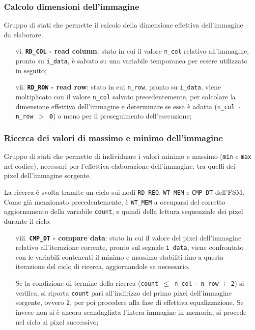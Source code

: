 \documentclass{article}
\begin{document}
\subsubsection{Calcolo dimensioni dell'immagine} %
Gruppo di stati che permette il calcolo della dimensione effettiva dell’immagine da elaborare.

\begin{itemize}
    \item [vi.]     \textbf{\texttt{RD\_COL} - read column}: stato in cui il valore \texttt{n\_col} relativo all’immagine, pronto su \texttt{i\_data}, è salvato su una variabile temporanea per essere utilizzato in seguito;
    \item [vii.]    \textbf{\texttt{RD\_ROW} - read row}: stato in cui \texttt{n\_row}, pronto su \texttt{i\_data}, viene moltiplicato con il valore \texttt{n\_col} salvato precedentemente, per calcolare la dimensione effettiva dell’immagine e determinare se essa è adatta (\texttt{n\_col $\cdot$ n\_row $>$ 0}) o meno per il proseguimento dell’esecuzione;
\end{itemize}

\subsubsection{Ricerca dei valori di massimo e minimo dell'immagine} %
Gruppo di stati che permette di individuare i valori minimo e massimo (\texttt{min} e \texttt{max} nel codice), necessari per l’effettiva elaborazione dell’immagine, tra quelli dei pixel dell’immagine sorgente.\par
La ricerca è svolta tramite un ciclo sui nodi \texttt{RD\_REQ}, \texttt{WT\_MEM} e \texttt{CMP\_DT} dell’FSM. Come già menzionato precedentemente, è \texttt{WT\_MEM} a occuparsi del corretto aggiornamento della variabile \texttt{count}, e quindi della lettura sequenziale dei pixel durante il ciclo.\par

\begin{itemize}
    \item [viii.]   \textbf{\texttt{CMP\_DT} - compare data}: stato in cui il valore del pixel dell’immagine relativo all’iterazione corrente, pronto sul segnale \texttt{i\_data}, viene confrontato con le variabili contenenti il minimo e massimo stabiliti fino a questa iterazione del ciclo di ricerca, aggiornandole se necessario.\par
                    Se la condizione di termine della ricerca (\texttt{count $\leq$ n\_col $\cdot$ n\_row $+$ 2}) si verifica, si riporta \texttt{count} pari all’indirizzo del primo pixel dell’immagine sorgente, ovvero \texttt{2}, per poi procedere alla fase di effettiva equalizzazione. Se invece non si è ancora scandagliata l’intera immagine in memoria, si procede nel ciclo al pixel successivo;
\end{itemize}
\end{document}
